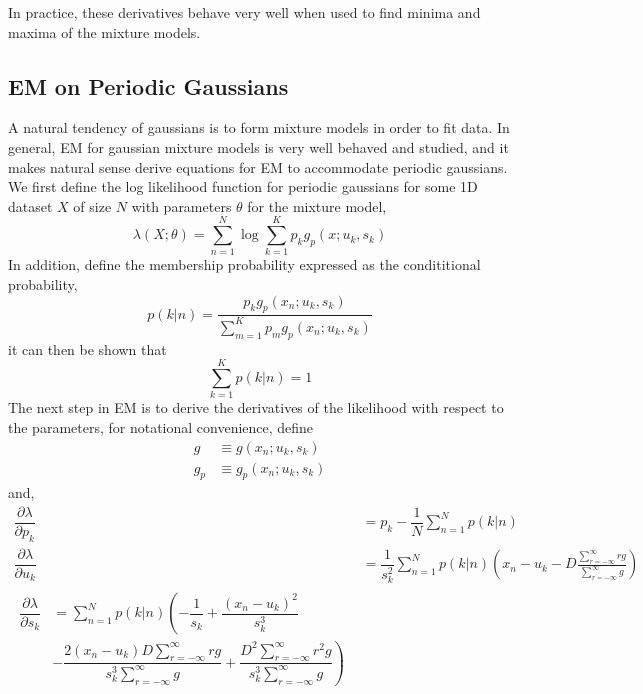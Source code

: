 \documentclass{acm_proc_article-sp}
\begin{document}
In practice, these derivatives behave very well when used to find minima and maxima of the mixture models.

\subsection{EM on Periodic Gaussians}

A natural tendency of gaussians is to form mixture models in order to fit data. In general, EM for gaussian mixture models is very well behaved and studied, and it makes natural sense derive equations for EM to accommodate periodic gaussians. We first define the log likelihood function for periodic gaussians for some 1D dataset \textbf{$X$} of size \textbf{$N$} with parameters \textbf{$\theta$} for the mixture model,
\begin{equation}
\lambda(X; \theta) = \sum_{n=1}^{N} \log \sum_{k=1}^{K} p_k g_p(x;u_k, s_k)
\end{equation}
In addition, define the membership probability expressed as the condititional probability,
\begin{equation}
p(k|n) = \dfrac{p_k g_p(x_n; u_k, s_k)}{\sum\limits^{K}_{m=1} p_m g_p(x_n; u_k, s_k)}
\end{equation}
it can then be shown that
\begin{equation}
\sum_{k=1}^{K} p(k|n) = 1
\end{equation}
The next step in EM is to derive the derivatives of the likelihood with respect to the parameters, for notational convenience, define
\begin{align}
g & \equiv g(x_n; u_k, s_k) \\
g_p & \equiv g_p(x_n; u_k, s_k)
\end{align}
and,
\begin{align}
\dfrac{\partial \lambda}{\partial p_k} & = p_k - \dfrac{1}{N} \sum\limits^{N}_{n=1}p(k|n) \\
\dfrac{\partial \lambda}{\partial u_k} &= \dfrac{1}{s_k^2} \sum_{n=1}^{N}p(k|n) \left(x_n - u_k - D \frac{\sum\limits^{\infty}_{r=-\infty} rg}{\sum\limits^{\infty}_{r=-\infty}g} \right) \\
\begin{split}
\dfrac{\partial \lambda}{\partial s_k} & = \sum\limits^{N}_{n=1}p(k|n) \left(-\dfrac{1}{s_k} + \dfrac{(x_n-u_k)^2}{s_k^3}\right. \\
&\left. -\dfrac{2(x_n-u_k)D\sum\limits^{\infty}_{r=-\infty}rg}{s_k^3 \sum\limits^{\infty}_{r=-\infty}g} + \dfrac{D^2 \sum\limits^{\infty}_{r=-\infty}r^2g}{s_k^3 \sum\limits^{\infty}_{r=-\infty}g} \right)
\end{split}
\end{align}
\end{document}
